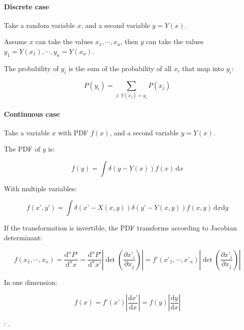 \paragraph{Discrete case}

Take a random variable $x$, and a second variable $y = Y(x)$.

Assume $x$ can take the values $x_{1}, \cdots, x_{n}$, then $y$ can take the values $y_{1} = Y(x_{1}), \cdots, y_{n} = Y(x_{n})$. 

The probability of $y_{i}$ is the sum of the probability of all $x_{i}$ that map into $y_{i}$:

\begin{equation}\label{eq:change_of_var_discrete}
	P(y_{i}) = \sum_{j: \ Y(x_{j})= y_{i}} P(x_{j})
\end{equation}

\paragraph{Continuous case}

Take a variable $x$ with PDF $f(x)$, and a second variable $y = Y(x)$.

The PDF of $y$ is:

\begin{equation}\label{eq:change_of_var_continuous}
	f(y) = \int {\delta(y - Y(x)) f(x)} \,\mathrm{d}x
\end{equation}

With multiple variables:

\begin{equation}
	f(x’, y’) = \int {\delta(x’ - X(x, y)) \delta(y’ - Y(x, y)) f(x, y)} \,\mathrm{d}x \mathrm{d}y
\end{equation}

If the transformation is invertible, the PDF transforms according to Jacobian determinant:

\begin{equation}
	f(x_{1}, \cdots, x_{n}) = \frac{\mathrm{d}^{n}P’}{\mathrm{d}^{n}x} 
	= \frac{\mathrm{d}^{n}P’}{\mathrm{d}^{n}x’} \left| \det \left(\frac{\partial x’_{i}}{\partial x_{j}} \right) \right|
	= f’(x’_{1}, \cdots, x’_{n}) \left| \det \left(\frac{\partial x’_{i}}{\partial x_{j}} \right) \right|
\end{equation}

In one dimension:

\begin{equation}
	f(x) = f’(x’) \left| \frac{\mathrm{d}x’}{\mathrm{d}x}\right|
	= f(y) \left| \frac{\mathrm{d}y}{\mathrm{d}x}\right|
\end{equation}

: .
